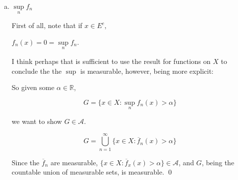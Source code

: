 \documentclass[11pt,oneside]{article}
\numberwithin{equation}{section}
\theoremstyle{definition}
\def\RR{\mathbb{R}}
\def\fancyA{\mathscr{A}}
\begin{document}
\begin{solution}
\begin{enumerate}[(a)]
  Now we show a sequence of combining mesaureable functions to get the result that $\overline f \overline g: X \to \overline \RR$ is measurable:

  $f, g$ are measurable, given.

  So $(f + g)$ is measurable, $\overline f + \overline g = \overline {( f + g)} $

  From the above lemma, $f^2$ and $g^2$ are measurable, as are $-f^2$ and $-g^2$.

  $ (f+g)^2$ is measurable.

  $(f^2 + 2 fg + g^2)$ is measurable (just pointwise expanding prior line).

  $(f^2 + 2 fg + g^2 - f^2 - g^2)$ is measurable (adding in $-f^2$ and $-g^2$)

  $2 f g $ is measurable.

  $ 1/2 \times 2 f g$ is measurable.

  $ f g$ is measurable.  
  \qed
  
\item
  $\sup \limits _{n} f_n$

  First of all, note that if $x \in E^c$,

  $f_n(x) = 0 = \sup \limits _ {n} f_n$.

  I think perhaps that is sufficient to use the result for functions
  on $X$ to conclude the the $\sup$ is measurable, however, being more explicit:
  
  So given some $\alpha \in \RR$,

  \[
  G = \{ x \in X : \sup \limits _{n} f_n(x) >  \alpha \}
  \]

  we want to show $G \in \fancyA$.

  \[
  G = \bigcup \limits _ {n=1} ^ \infty \{ x \in X : \overline f_n(x) > \alpha \}
  \]

  Since the $\overline f_n$ are measurable,  $\{ x \in X : \overline f_x(x) > \alpha \} \in \fancyA$,
  and $G$, being the countable union of measurable sets, is measurable.
  \qed
\end{enumerate}
\end{solution}
\end{document}
